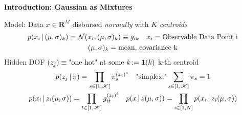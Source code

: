 

\begin{frame}[plain]
\maketitle
\end{frame}



\begin{frame} [t] 
   {\bf Introduction: Gaussian as Mixtures} 
   {}

Model: Data $x \in \mathbf {R} ^{M}$ 
disbursed {\it normally} with $K$ {\it centroids}
\begin {gather*}
     p ( x _{i} \,\vert\, ( \mu , \sigma) _{k} ) 
    =
     \mathcal {N} 
     (x_{i}, ( \mu , \sigma) _{k}) 
    \equiv g _{ik} 
    \quad 
    x_{i} = 
    \textnormal 
      {Observable Data Point i}  
\\
    (\mu, \sigma) _{k} 
=
    \textnormal 
    {mean, covariance k} 
\end {gather*} 
\alert {Hidden DOF} 
$ 
 ( z_{j} ) 
 \equiv \textnormal {"one hot"   
 at some {\it k}}
 := \mathbf{1} (k)
$ 
\alert {k-th centroid}
\begin{gather*}
    p ( z_{j} \,\vert\, \pi ) 
    =
     \prod _{ s \in [1, \mathscr {K}]} 
     \pi _{s} ^{(z_{j}) ^{s}} 
\quad 
    \textnormal {"simplex:"} 
    \sum _{s \in [1, \mathscr {K}]}
    \pi _{s} 
=
    1
\\
    p ( x_{i} \,\vert\, z_{i} (\mu, \sigma)  )
=   
    \prod 
       _{t \in [1, \mathscr {K}]}
    g _{it}
      ^{(z_{i})^{t}}
\quad 
        p ( x \,\vert\, z (\mu, \sigma)  )
=
    \prod _{i\in [1, N]}
        p ( x_{i} \,\vert\, z_{i} (\mu, \sigma)  )
\end{gather*}

\end{frame}


